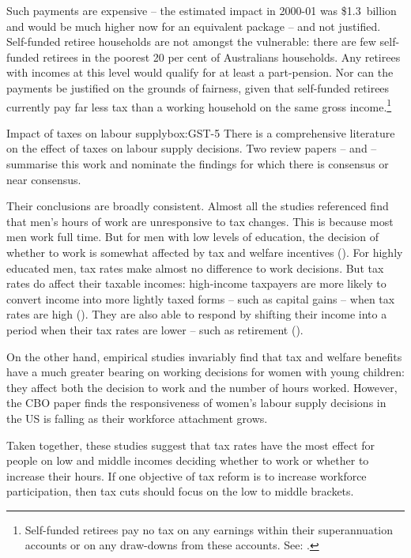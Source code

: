Such payments are expensive – the estimated impact in 2000-01 was \$1.3~billion and would be much higher now for an equivalent package – and not justified. Self-funded retiree households are not amongst the vulnerable: there are few self-funded retirees in the poorest 20 per cent of Australians households. Any retirees with incomes at this level would qualify for at least a part-pension. Nor can the payments be justified on the grounds of fairness, given that self-funded retirees currently pay far less tax than a working household on the same gross income.\footnote{Self-funded retirees pay no tax on any earnings within their superannuation accounts or on any draw-downs from these accounts. See: .}  



\begin{smallbox}{Impact of taxes on labour supply}{box:GST-5}
There is a comprehensive literature on the effect of taxes on labour supply decisions. Two review papers – \textcite{MeghirPhillips2008} and \textcite{CBO-2012-Labor-Supply-Elasticity} – summarise this work and nominate the findings for which there is consensus or near consensus.

Their conclusions are broadly consistent. Almost all the studies referenced find that men’s hours of work are unresponsive to tax changes. This is because most men work full time. But for men with low levels of education, the decision of whether to work is somewhat affected by tax and welfare incentives (\textcite{MeghirPhillips2008}). For highly educated men, tax rates make almost no difference to work decisions. But tax rates do affect their taxable incomes: high-income taxpayers are more likely to convert income into more lightly taxed forms – such as capital gains – when tax rates are high (\textcite{MeghirPhillips2008}). They are also able to respond by shifting their income into a period when their tax rates are lower – such as retirement (\textcite{CBO-2012-Labor-Supply-Elasticity}).

On the other hand, empirical studies invariably find that tax and welfare benefits have a much greater bearing on working decisions for women with young children: they affect both the decision to work and the number of hours worked. However, the CBO paper finds the responsiveness of women’s labour supply decisions in the US is falling as their workforce attachment grows.

Taken together, these studies suggest that tax rates have the most effect for people on low and middle incomes deciding whether to work or whether to increase their hours. If one objective of tax reform is to increase workforce participation, then tax cuts should focus on the low to middle brackets.
\end{smallbox}

